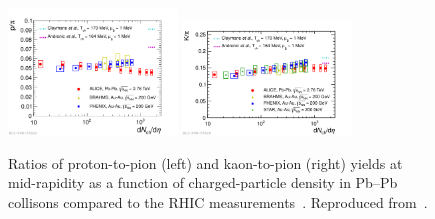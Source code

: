\begin{figure}
\centering
\includegraphics[width=0.4\textwidth]{ksfigures/YieldProtonToPion.pdf}
\includegraphics[width=0.4\textwidth]{ksfigures/YieldKaonToPion.pdf}
\caption{Ratios of proton-to-pion (left) and kaon-to-pion (right) yields at mid-rapidity as a function of charged-particle density in Pb--Pb collisons compared to the RHIC measurements~\cite{Abelev:2008ab,Bearden:2001qq,Adler:2003cb}. Reproduced from~\cite{Abelev:2013vea}.}
\label{figks:YieldProtonKaon}
\end{figure}


